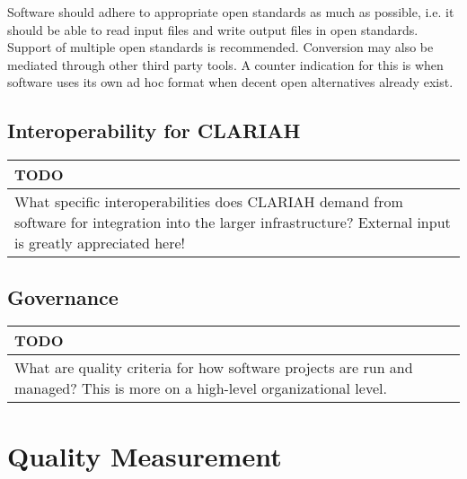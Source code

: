 \documentclass[a4paper,11pt]{article}
\newenvironment{TODO}{
\begin{center}
    \begin{tabular}[h!]{|p{0.8\textwidth}|}
    \hline
    {\bf TODO}\\\hline}
{   \\\hline
    \end{tabular}
\end{center}}
\newcommand\CheckTable{%
  \begin{tabular}{ccccc}
    No & Minimal & Adequate & Good & Perfect \\
    0 & 1 & 2 & 3 & 4 \\
    \hline
    $\square$ & $\square$ & $\square$ & $\square$ & $\square$ \\
  \end{tabular}%
}
\begin{document}
Software should adhere to appropriate open standards as much as possible, i.e.
it should be able to read input files and write output files in open
standards. Support of multiple open standards is recommended. Conversion may
also be mediated through other third party tools. A counter indication for this
is when software uses its own ad hoc format when decent open alternatives
already exist.


\subsection{Interoperability for CLARIAH}\label{sec:intCLA}


\begin{TODO} 
What specific interoperabilities does CLARIAH demand from software for
integration into the larger infrastructure?  External input is greatly
appreciated here!
\end{TODO}


\subsection{Governance}\label{sec:gov}




\begin{TODO} 
What are quality criteria for how software projects are run and
managed? This is more on a high-level organizational level.
\end{TODO}


\section{Quality Measurement}
\end{document}
